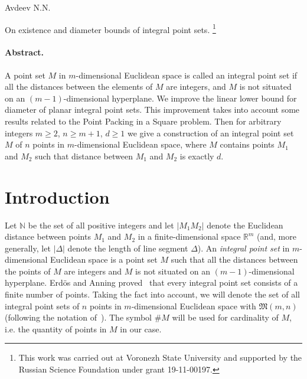 \documentclass[a4paper,14pt]{article} %
\theoremstyle{plain}
\theoremstyle{definition}
\begin{document}

Avdeev N.N.

On existence and diameter bounds of integral point sets.
\footnote{
	This work was carried out at Voronezh State University and supported by the Russian Science
	Foundation under grant 19-11-00197.
}

\paragraph{Abstract.}
A point set $M$ in $m$-dimensional Euclidean space is called an integral point set if all the distances between the
elements of $M$ are integers, and $M$ is not situated on an $(m-1)$-dimensional hyperplane.
We improve the linear lower bound for diameter of planar integral point sets.
This improvement takes into account some results related to the Point Packing in a Square problem.
Then for arbitrary integers $m \geq 2$, $n \geq m+1$, $d \geq 1$
we give a construction of an integral point set $M$ of $n$ points in $m$-dimensional Euclidean space,
where $M$ contains points $M_1$ and $M_2$ such that distance between $M_1$ and $M_2$ is exactly $d$.



\section{Introduction}
Let $\mathbb{N}$ be the set of all positive integers and let $|M_1 M_2|$ denote the Euclidean distance
between points $M_1$ and $M_2$ in a finite-dimensional space $\mathbb{R}^m$
(and, more generally, let $|\Delta|$ denote the length of line segment $\Delta$).
An \textit{integral point set} in $m$-dimensional Euclidean space is a point set $M$ such that all the distances between the
points of $M$ are integers and $M$ is not situated on an $(m-1)$-dimensional hyperplane.
Erd\"os and Anning proved~\cite{anning1945integral,erdos1945integral} that every integral point set consists of a finite number of points.
Taking the fact into account, we will denote the set of all integral point sets of $n$ points in $m$-dimensional Euclidean space with
$\mathfrak{M}(m,n)$ (following the notation of~\cite{our-vmmsh-2018}).
The symbol $\# M$ will be used for cardinality of $M$, i.e. the quantity of points in $M$ in our case.
\end{document}
